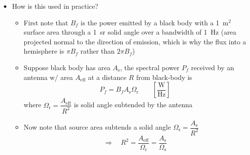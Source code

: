 \documentclass[11pt, oneside]{article}
\newcommand{\Aeff}{A_\mathrm{eff}}
\begin{document}
\begin{itemize}
	\item How is this used in practice?
	\begin{itemize}
		\item[$\hookrightarrow$] First note that $B_f$ is the power emitted by a black body with a 1~m$^2$ surface area through a 1~sr solid angle over a bandwidth of 1~Hz (area projected normal to the direction of emission, which is why the flux into a hemisphere is $\pi B_f$ rather than $2\pi B_f$)
		\item[$\hookrightarrow$] Suppose black body has area $A_\mathrm{s}$, the spectral power $P_f$ received by an antenna w/ area $\Aeff$ at a distance $R$ from black-body is
		\begin{equation}
			\label{e:Pf1}
			P_f = B_f A_\mathrm{s} \Omega_\mathrm{r} \qquad \left[\frac{\text{W}}{\text{Hz}}\right]
		\end{equation}
		where $\Omega_\mathrm{r} = \dfrac{\Aeff}{R^2}$ is solid angle subtended by the antenna
		\item[$\hookrightarrow$] Now note that source area subtends a solid angle $\Omega_\mathrm{s} = \dfrac{A_\mathrm{s}}{R^2}$
		\begin{equation*}
			\Rightarrow\quad R^2 = \frac{\Aeff}{\Omega_\mathrm{r}} = \frac{A_\mathrm{s}}{\Omega_\mathrm{s}}

\end{equation*}
\end{itemize}
\end{itemize}
\end{document}
